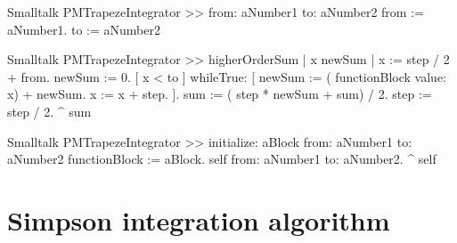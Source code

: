 \begin{displaycode}{Smalltalk}
PMTrapezeIntegrator >> from: aNumber1 to: aNumber2
    from := aNumber1.
    to := aNumber2
\end{displaycode}

\begin{displaycode}{Smalltalk}
PMTrapezeIntegrator >> higherOrderSum
    | x newSum |
    x := step / 2 + from.
    newSum := 0.
    [ x < to ]
        whileTrue: [ newSum := ( functionBlock value: x) + newSum.
                     x := x + step.
                   ].
    sum := ( step * newSum + sum) / 2.
    step := step / 2.
    ^ sum
\end{displaycode}

\begin{displaycode}{Smalltalk}
PMTrapezeIntegrator >> initialize: aBlock from: aNumber1 to: aNumber2
    functionBlock := aBlock.
    self from: aNumber1 to: aNumber2.
    ^ self
\end{displaycode}

\section{Simpson integration algorithm}

